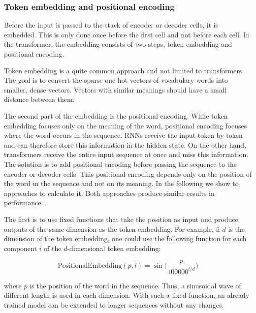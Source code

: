 \documentclass[a4paper]{scrartcl}
\begin{document}
    \subsubsection{Token embedding and positional encoding}
    Before the input is passed to the stack of encoder or decoder cells, it is embedded.
    This is only done once before the first cell and not before each cell.
    In the transformer, the embedding consists of two steps, token embedding and positional encoding.

    Token embedding is a quite common approach and not limited to transformers.
    The goal is to convert the sparse one-hot vectors of vocabulary words into smaller, dense vectors.
    Vectors with similar meanings should have a small distance between them.

    The second part of the embedding is the positional encoding.
    While token embedding focuses only on the meaning of the word, positional encoding focuses where the word occurs in the sequence.
    RNNs receive the input token by token and can therefore store this information in the hidden state.
    On the other hand, transformers receive the entire input sequence at once and miss this information.
    The solution is to add positional encoding before passing the sequence to the encoder or decoder cells.
    This positional encoding depends only on the position of the word in the sequence and not on its meaning.
    In the following we show to approaches to calculate it.
    Both approaches produce similar results in performance~\cite{vaswani2017attention}.

    The first is to use fixed functions that take the position as input and produce outputs of the same dimension as the token embedding.
    For example, if $d$ is the dimension of the token embedding, one could use the following function for each component $i$ of the $d$-dimensional token embedding:

    \begin{equation}
        \text{PositionalEmbedding}(p, i) = \sin\biggl(\frac{p}{100000^{i/d}}\biggr)\label{eq:pos-embed}
    \end{equation}


    where $p$ is the position of the word in the sequence.
    Thus, a sinusoidal wave of different length is used in each dimension.
    With such a fixed function, an already trained model can be extended to longer sequences without any changes.
\end{document}
